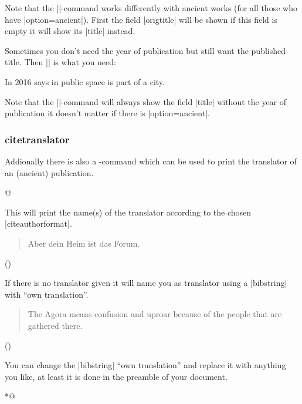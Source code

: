 \documentclass[a4paper,
10pt,
greek,
french,
spanish,
italian,
ngerman,
english
]{ltxdoc}
\begin{document}
Note that the |\citetitle|-command works differently with ancient works (for all those who have  |option={ancient}|). 
First the field |origtitle| will be shown if this field is empty it will show its |title| instead. 

\DescribeMacro{\citetitle*}
Sometimes you don’t need the year of publication but still want the published title. 
Then |\citetitle*| is what you need:
\begin{example}
In 2016  \citeauthor{Osland2016} says in  
public space is part of a city.
\end{example}

Note that the |\citetitle*|-command will always show the field |title| without the year of publication it doesn’t matter if there is |option={ancient}|.

\subsubsection{citetranslator}
\DescribeMacro{\citetranslator}\label{citetranslator}%
Addionally there is also a -command which can be used to print the translator of an (ancient) publication.
\begin{code}
\citetranslator*@%
\end{code}
This will print the name(s) of the translator according to the chosen |citeauthorformat|.

\begin{example}
\blockcquote[12,25,1]{Cic:Att}{Aber dein Heim ist das Forum.} ()
\end{example}
If there is no translator given it will name you as translator using a |bibstring| with \enquote{own translation}.
\begin{example}
\blockcquote[3,62,1]{Artem}{The Agora means confusion and uproar because of the people that are gathered there.} ()
\end{example}
You can change the |bibstring| \enquote{own translation} and replace it with anything you like, 
at least it is done in the preamble of your document.
\begin{code}
\end{code}



\DescribeMacro{\citetranslator*}
\begin{code}
\citetranslator* *@%
\end{code} 
\end{document}
